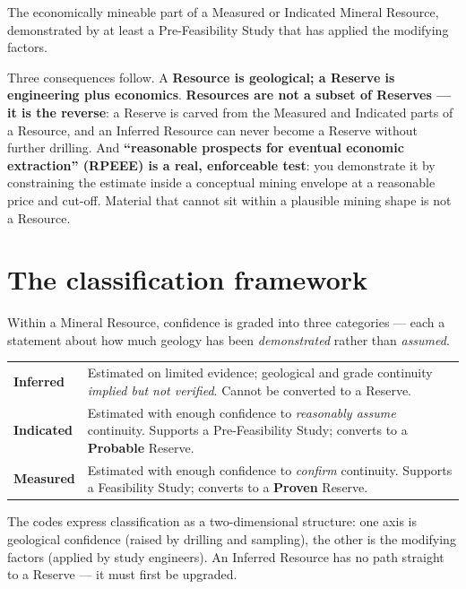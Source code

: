 \documentclass[11pt]{article}
\begin{document}
\begin{defbox}
The economically mineable part of a Measured or Indicated Mineral
Resource, demonstrated by at least a Pre-Feasibility Study that has
applied the modifying factors.
\end{defbox}

Three consequences follow. A \textbf{Resource is geological; a Reserve is
engineering plus economics}. \textbf{Resources are not a subset of
Reserves --- it is the reverse}: a Reserve is carved from the Measured
and Indicated parts of a Resource, and an Inferred Resource can never
become a Reserve without further drilling. And \textbf{``reasonable
prospects for eventual economic extraction'' (RPEEE) is a real,
enforceable test}: you demonstrate it by constraining the estimate inside
a conceptual mining envelope at a reasonable price and cut-off. Material
that cannot sit within a plausible mining shape is not a Resource.

\section{The classification framework}

Within a Mineral Resource, confidence is graded into three categories ---
each a statement about how much geology has been \emph{demonstrated}
rather than \emph{assumed}.

\begin{center}\small
\begin{tabular}{@{}p{2.4cm}p{12cm}@{}}
\toprule
\textbf{Inferred} & Estimated on limited evidence; geological and grade
continuity \emph{implied but not verified}. Cannot be converted to a
Reserve.\\[3pt]
\textbf{Indicated} & Estimated with enough confidence to \emph{reasonably
assume} continuity. Supports a Pre-Feasibility Study; converts to a
\textbf{Probable} Reserve.\\[3pt]
\textbf{Measured} & Estimated with enough confidence to \emph{confirm}
continuity. Supports a Feasibility Study; converts to a \textbf{Proven}
Reserve.\\
\bottomrule
\end{tabular}
\end{center}

The codes express classification as a two-dimensional structure: one axis
is geological confidence (raised by drilling and sampling), the other is
the modifying factors (applied by study engineers). An Inferred Resource
has no path straight to a Reserve --- it must first be upgraded.
\end{document}
